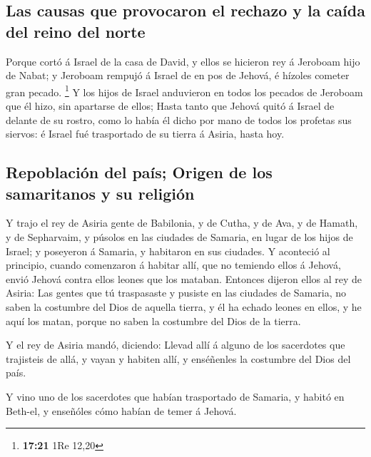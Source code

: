 \hypertarget{las-causas-que-provocaron-el-rechazo-y-la-cauxedda-del-reino-del-norte}{%
\subsection{Las causas que provocaron el rechazo y la caída del reino
del
norte}\label{las-causas-que-provocaron-el-rechazo-y-la-cauxedda-del-reino-del-norte}}

 Porque cortó á Israel de la casa de David, y ellos se
hicieron rey á Jeroboam hijo de Nabat; y Jeroboam rempujó á Israel de en
pos de Jehová, é hízoles cometer gran pecado. \footnote{\textbf{17:21}
  1Re 12,20}  Y los hijos de Israel anduvieron en todos
los pecados de Jeroboam que él hizo, sin apartarse de ellos;
 Hasta tanto que Jehová quitó á Israel de delante de su
rostro, como lo había él dicho por mano de todos los profetas sus
siervos: é Israel fué trasportado de su tierra á Asiria, hasta hoy.

\hypertarget{repoblaciuxf3n-del-pauxeds-origen-de-los-samaritanos-y-su-religiuxf3n}{%
\subsection{Repoblación del país; Origen de los samaritanos y su
religión}\label{repoblaciuxf3n-del-pauxeds-origen-de-los-samaritanos-y-su-religiuxf3n}}

 Y trajo el rey de Asiria gente de Babilonia, y de Cutha,
y de Ava, y de Hamath, y de Sepharvaim, y púsolos en las ciudades de
Samaria, en lugar de los hijos de Israel; y poseyeron á Samaria, y
habitaron en sus ciudades.  Y aconteció al principio,
cuando comenzaron á habitar allí, que no temiendo ellos á Jehová, envió
Jehová contra ellos leones que los mataban.  Entonces
dijeron ellos al rey de Asiria: Las gentes que tú traspasaste y pusiste
en las ciudades de Samaria, no saben la costumbre del Dios de aquella
tierra, y él ha echado leones en ellos, y he aquí los matan, porque no
saben la costumbre del Dios de la tierra.

 Y el rey de Asiria mandó, diciendo: Llevad allí á alguno
de los sacerdotes que trajisteis de allá, y vayan y habiten allí, y
enséñenles la costumbre del Dios del país.

 Y vino uno de los sacerdotes que habían trasportado de
Samaria, y habitó en Beth-el, y enseñóles cómo habían de temer á Jehová.

